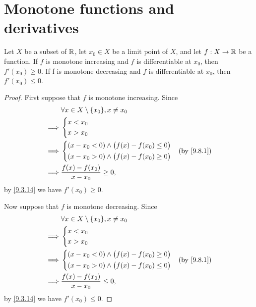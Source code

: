 \section{Monotone functions and derivatives}\label{sec:10.3}

\begin{prop}\label{10.3.1}
  Let \(X\) be a subset of \(\mathbb{R}\), let \(x_0 \in X\) be a limit point of \(X\), and let \(f : X \to \mathbb{R}\) be a function.
  If \(f\) is monotone increasing and \(f\) is differentiable at \(x_0\), then \(f'(x_0) \geq 0\).
  If f is monotone decreasing and \(f\) is differentiable at \(x_0\), then \(f'(x_0) \leq 0\).
\end{prop}

\begin{proof}
  First suppose that \(f\) is monotone increasing.
  Since
  \begin{align*}
             & \forall x \in X \setminus \set{x_0}, x \neq x_0    \\
    \implies & \begin{dcases}
                 x < x_0 \\
                 x > x_0 \\
               \end{dcases}                                      \\
    \implies & \begin{dcases}
                 (x - x_0 < 0) \land \big(f(x) - f(x_0) \leq 0\big) \\
                 (x - x_0 > 0) \land \big(f(x) - f(x_0) \geq 0\big) \\
               \end{dcases} &  & \by{9.8.1} \\
    \implies & \dfrac{f(x) - f(x_0)}{x - x_0} \geq 0,
  \end{align*}
  by \cref{9.3.14} we have \(f'(x_0) \geq 0\).

  Now suppose that \(f\) is monotone decreasing.
  Since
  \begin{align*}
             & \forall x \in X \setminus \set{x_0}, x \neq x_0    \\
    \implies & \begin{dcases}
                 x < x_0 \\
                 x > x_0 \\
               \end{dcases}                                      \\
    \implies & \begin{dcases}
                 (x - x_0 < 0) \land \big(f(x) - f(x_0) \geq 0\big) \\
                 (x - x_0 > 0) \land \big(f(x) - f(x_0) \leq 0\big) \\
               \end{dcases} &  & \by{9.8.1} \\
    \implies & \dfrac{f(x) - f(x_0)}{x - x_0} \leq 0,
  \end{align*}
  by \cref{9.3.14} we have \(f'(x_0) \leq 0\).
\end{proof}

